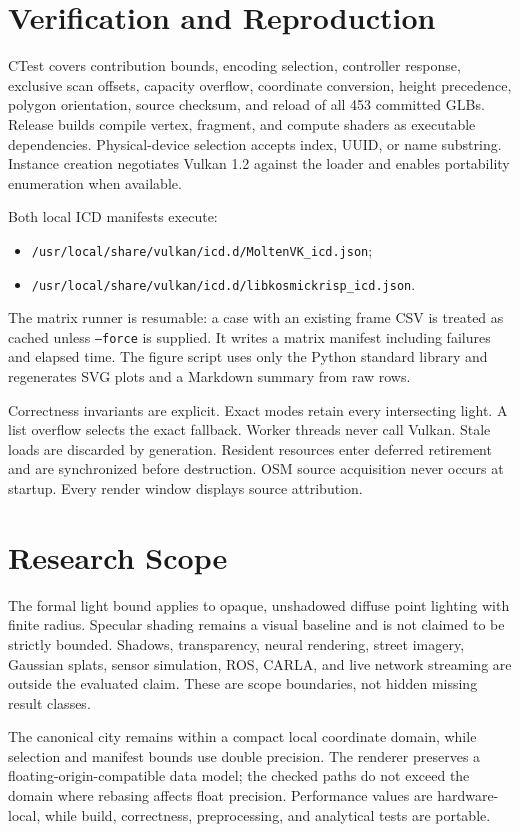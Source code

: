 \documentclass[10pt,twocolumn]{article}
\begin{document}
\clearpage
\section{Verification and Reproduction}
CTest covers contribution bounds, encoding selection, controller response, exclusive scan offsets,
capacity overflow, coordinate conversion, height precedence, polygon orientation, source checksum,
and reload of all 453 committed GLBs. Release builds compile vertex, fragment, and compute shaders
as executable dependencies. Physical-device selection accepts index, UUID, or name substring.
Instance creation negotiates Vulkan 1.2 against the loader and enables portability enumeration when
available.

Both local ICD manifests execute:
\begin{itemize}
\item \texttt{/usr/local/share/vulkan/icd.d/MoltenVK\_icd.json};
\item \texttt{/usr/local/share/vulkan/icd.d/libkosmickrisp\_icd.json}.
\end{itemize}
The matrix runner is resumable: a case with an existing frame CSV is treated as cached unless
\texttt{--force} is supplied. It writes a matrix manifest including failures and elapsed time.
The figure script uses only the Python standard library and regenerates SVG plots and a Markdown
summary from raw rows.

Correctness invariants are explicit. Exact modes retain every intersecting light. A list overflow
selects the exact fallback. Worker threads never call Vulkan. Stale loads are discarded by
generation. Resident resources enter deferred retirement and are synchronized before destruction.
OSM source acquisition never occurs at startup. Every render window displays source attribution.

\section{Research Scope}
The formal light bound applies to opaque, unshadowed diffuse point lighting with finite radius.
Specular shading remains a visual baseline and is not claimed to be strictly bounded. Shadows,
transparency, neural rendering, street imagery, Gaussian splats, sensor simulation, ROS, CARLA, and
live network streaming are outside the evaluated claim. These are scope boundaries, not hidden
missing result classes.

The canonical city remains within a compact local coordinate domain, while selection and manifest
bounds use double precision. The renderer preserves a floating-origin-compatible data model; the
checked paths do not exceed the domain where rebasing affects float precision. Performance values
are hardware-local, while build, correctness, preprocessing, and analytical tests are portable.
\end{document}
